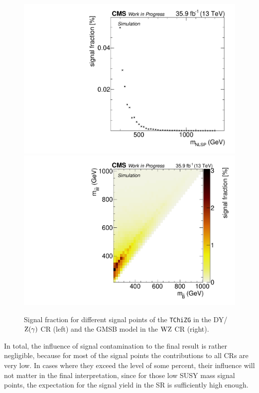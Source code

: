 \begin{figure}
 \includegraphics[width=\pairwidth]{figures/contamination/tching_DY}
 \includegraphics[width=\pairwidth]{figures/contamination/gmsb_WZ}
 \caption{Signal fraction for different signal points of the \texttt{TChiZG} in the DY/$\mathrm{Z}(\gamma)$ CR (left) and the GMSB model in the $\mathrm{W}\mathrm{Z}$ CR (right).}
 \label{fig:signalCont}
\end{figure}
In total, the influence of signal contamination to the final result is rather negligible, because for most of the signal points the contributions to all CRs are very low. In cases where they exceed the level of some percent, their influence will not matter in the final interpretation, since for those low SUSY mass signal points, the expectation for the signal yield in the SR is sufficiently high enough.


